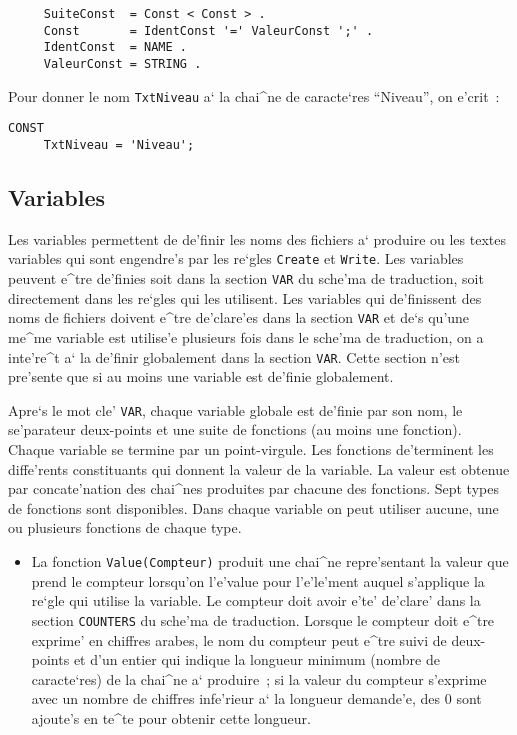 {\begin{verbatim}
     SuiteConst  = Const < Const > .
     Const       = IdentConst '=' ValeurConst ';' .
     IdentConst  = NAME .
     ValeurConst = STRING .
\end{verbatim}

\label{txtniveau}
\begin{example}
Pour donner le nom {\tt TxtNiveau} a` la chai^ne de caracte`res ``Niveau'',
on e'crit~:
\begin{verbatim}
CONST
     TxtNiveau = 'Niveau';
\end{verbatim}
\end{example}

\subsection{Variables}
\label{sectvar}

Les variables permettent de de'finir les noms des fichiers a` produire ou
les textes variables qui sont engendre's par les re`gles {\tt Create} et
{\tt Write}. Les variables peuvent e^tre de'finies soit dans la section
{\tt VAR} du sche'ma de traduction, soit directement dans les re`gles qui
les utilisent. Les variables qui de'finissent des noms de fichiers doivent
e^tre de'clare'es dans la section {\tt VAR} et de`s qu'une me^me variable est
utilise'e plusieurs fois dans le sche'ma de traduction, on a inte're^t a` la
de'finir globalement dans la section {\tt VAR}. Cette section n'est pre'sente
que si au moins une variable est de'finie globalement.

Apre`s le mot cle' {\tt VAR}, chaque variable globale est de'finie par son
nom, le se'parateur deux-points et une suite de fonctions (au moins une fonction).
Chaque variable se termine par un point-virgule.
Les fonctions de'terminent les diffe'rents constituants qui donnent la valeur
de la variable. La valeur est obtenue par concate'nation des chai^nes produites
par chacune des fonctions. Sept types de fonctions sont disponibles. Dans
chaque variable on peut utiliser aucune, une ou plusieurs fonctions de
chaque type.

\begin{itemize}
\item
La fonction {\tt Value(Compteur)} produit une chai^ne repre'sentant la
valeur que prend le compteur lorsqu'on l'e'value pour l'e'le'ment auquel
s'applique la re`gle qui utilise la variable. Le compteur doit avoir e'te'
de'clare' dans la section {\tt COUNTERS} du sche'ma de traduction. Lorsque
le compteur doit e^tre exprime' en chiffres arabes, le nom
du compteur peut e^tre suivi de deux-points et d'un entier qui indique la
longueur minimum (nombre de caracte`res) de la chai^ne a` produire~; si
la valeur du compteur s'exprime avec un nombre de chiffres infe'rieur a`
la longueur demande'e, des 0 sont ajoute's en te^te pour obtenir cette
longueur.


\end{itemize}}
